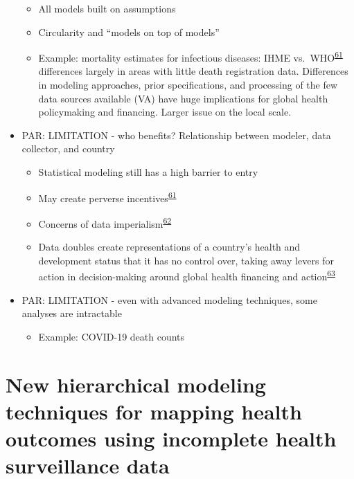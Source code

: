 \documentclass[
]{article}
\providecommand{\tightlist}{%
  \setlength{\itemsep}{0pt}\setlength{\parskip}{0pt}}
\begin{document}
\begin{itemize}
  \begin{itemize}
  \tightlist
  \item
    All models built on assumptions
  \item
    Circularity and ``models on top of models''
  \item
    Example: mortality estimates for infectious diseases: IHME vs.~WHO\textsuperscript{\protect\hyperlink{ref-Tichenor2020}{61}} differences largely in areas with little death registration data. Differences in modeling approaches, prior specifications, and processing of the few data sources available (VA) have huge implications for global health policymaking and financing. Larger issue on the local scale.
  \end{itemize}
\item
  PAR: LIMITATION - who benefits? Relationship between modeler, data collector, and country

  \begin{itemize}
  \tightlist
  \item
    Statistical modeling still has a high barrier to entry
  \item
    May create perverse incentives\textsuperscript{\protect\hyperlink{ref-Tichenor2020}{61}}
  \item
    Concerns of data imperialism\textsuperscript{\protect\hyperlink{ref-Marchais2020}{62}}
  \item
    Data doubles create representations of a country's health and development status that it has no control over, taking away levers for action in decision-making around global health financing and action\textsuperscript{\protect\hyperlink{ref-Cinnamon2020a}{63}}
  \end{itemize}
\item
  PAR: LIMITATION - even with advanced modeling techniques, some analyses are intractable

  \begin{itemize}
  \tightlist
  \item
    Example: COVID-19 death counts
  \end{itemize}
\end{itemize}

\hypertarget{new-hierarchical-modeling-techniques-for-mapping-health-outcomes-using-incomplete-health-surveillance-data}{%
\section{New hierarchical modeling techniques for mapping health outcomes using incomplete health surveillance data}\label{new-hierarchical-modeling-techniques-for-mapping-health-outcomes-using-incomplete-health-surveillance-data}}
\end{document}
